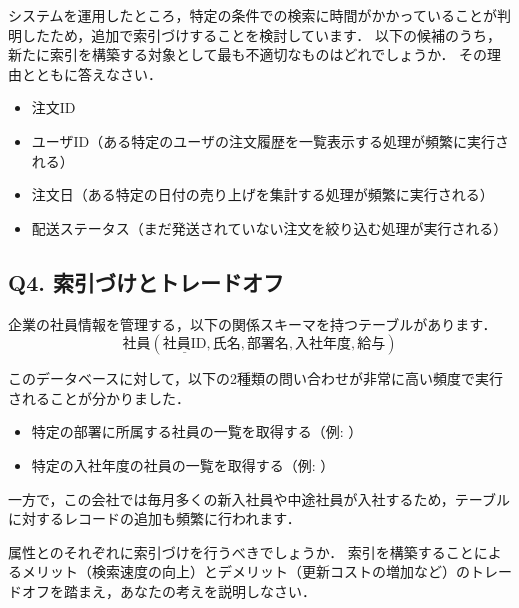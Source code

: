 システムを運用したところ，特定の条件での検索に時間がかかっていることが判明したため，追加で索引づけすることを検討しています．
以下の候補のうち，新たに索引を構築する対象として最も不適切なものはどれでしょうか．
その理由とともに答えなさい．

\begin{itemize}
\item 注文ID
\item ユーザID（ある特定のユーザの注文履歴を一覧表示する処理が頻繁に実行される）
\item 注文日（ある特定の日付の売り上げを集計する処理が頻繁に実行される）
\item 配送ステータス（まだ発送されていない注文を絞り込む処理が実行される）
\end{itemize}


\subsection*{Q4. 索引づけとトレードオフ}
企業の社員情報を管理する，以下の関係スキーマを持つテーブルがあります．
\begin{equation}
\textbf{社員}(\underline{\text{社員ID}}, \text{氏名}, \text{部署名}, \text{入社年度}, \text{給与})
\end{equation}

このデータベースに対して，以下の2種類の問い合わせが非常に高い頻度で実行されることが分かりました．
\begin{itemize}
    \item 特定の部署に所属する社員の一覧を取得する（例: ）
    \item 特定の入社年度の社員の一覧を取得する（例: ）
\end{itemize}
一方で，この会社では毎月多くの新入社員や中途社員が入社するため，テーブルに対するレコードの追加も頻繁に行われます．

属性とのそれぞれに索引づけを行うべきでしょうか．
索引を構築することによるメリット（検索速度の向上）とデメリット（更新コストの増加など）のトレードオフを踏まえ，あなたの考えを説明しなさい．
